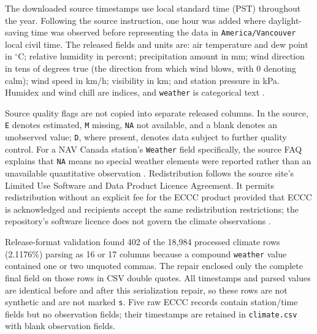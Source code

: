 \documentclass{IEEEoj-data}
\begin{document}
The downloaded source timestamps use local standard time (PST) throughout the year. Following the source instruction, one hour was added where daylight-saving time was observed before representing the data in \texttt{America/Vancouver} local civil time. The released fields and units are: air temperature and dew point in $^\circ$C; relative humidity in percent; precipitation amount in mm; wind direction in tens of degrees true (the direction from which wind blows, with 0 denoting calm); wind speed in km/h; visibility in km; and station pressure in kPa. Humidex and wind chill are indices, and \texttt{weather} is categorical text \cite{eccctech}.

Source quality flags are not copied into separate released columns. In the source, \texttt{E} denotes estimated, \texttt{M} missing, \texttt{NA} not available, and a blank denotes an unobserved value; \texttt{D}, where present, denotes data subject to further quality control. For a NAV Canada station's \texttt{Weather} field specifically, the source FAQ explains that \texttt{NA} means no special weather elements were reported rather than an unavailable quantitative observation \cite{ecccfaq}. Redistribution follows the source site's Limited Use Software and Data Product Licence Agreement. It permits redistribution without an explicit fee for the ECCC product provided that ECCC is acknowledged and recipients accept the same redistribution restrictions; the repository's software licence does not govern the climate observations \cite{eccclicense}.

Release-format validation found 402 of the 18,984 processed climate rows (2.1176\%) parsing as 16 or 17 columns because a compound \texttt{weather} value contained one or two unquoted commas. The repair enclosed only the complete final field on those rows in CSV double quotes. All timestamps and parsed values are identical before and after this serialization repair, so these rows are not synthetic and are not marked \texttt{s}. Five raw ECCC records contain station/time fields but no observation fields; their timestamps are retained in \texttt{climate.csv} with blank observation fields.
\end{document}

